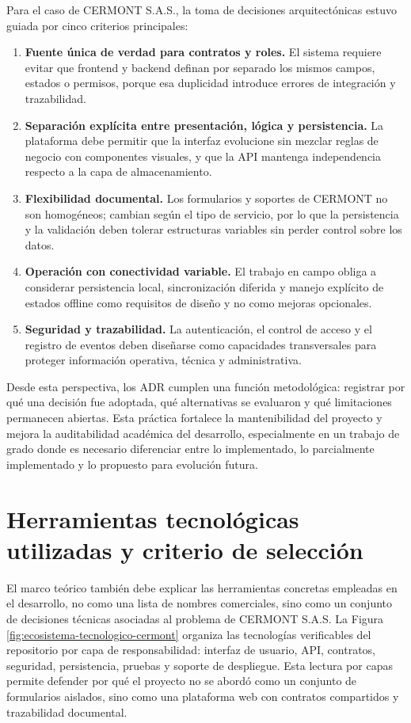 Para el caso de CERMONT S.A.S., la toma de decisiones arquitectónicas estuvo guiada por cinco criterios principales:

\begin{enumerate}
    \item \textbf{Fuente única de verdad para contratos y roles.} El sistema requiere evitar que frontend y backend definan por separado los mismos campos, estados o permisos, porque esa duplicidad introduce errores de integración y trazabilidad.
    \item \textbf{Separación explícita entre presentación, lógica y persistencia.} La plataforma debe permitir que la interfaz evolucione sin mezclar reglas de negocio con componentes visuales, y que la API mantenga independencia respecto a la capa de almacenamiento.
    \item \textbf{Flexibilidad documental.} Los formularios y soportes de CERMONT no son homogéneos; cambian según el tipo de servicio, por lo que la persistencia y la validación deben tolerar estructuras variables sin perder control sobre los datos.
    \item \textbf{Operación con conectividad variable.} El trabajo en campo obliga a considerar persistencia local, sincronización diferida y manejo explícito de estados offline como requisitos de diseño y no como mejoras opcionales.
    \item \textbf{Seguridad y trazabilidad.} La autenticación, el control de acceso y el registro de eventos deben diseñarse como capacidades transversales para proteger información operativa, técnica y administrativa.
\end{enumerate}

Desde esta perspectiva, los ADR cumplen una función metodológica: registrar por qué una decisión fue adoptada, qué alternativas se evaluaron y qué limitaciones permanecen abiertas. Esta práctica fortalece la mantenibilidad del proyecto y mejora la auditabilidad académica del desarrollo, especialmente en un trabajo de grado donde es necesario diferenciar entre lo implementado, lo parcialmente implementado y lo propuesto para evolución futura.

\section{Herramientas tecnológicas utilizadas y criterio de selección}
\label{sec:herramientas-stack-teorico}

El marco teórico también debe explicar las herramientas concretas empleadas en el desarrollo, no como una lista de nombres comerciales, sino como un conjunto de decisiones técnicas asociadas al problema de CERMONT S.A.S. La Figura \ref{fig:ecosistema-tecnologico-cermont} organiza las tecnologías verificables del repositorio por capa de responsabilidad: interfaz de usuario, API, contratos, seguridad, persistencia, pruebas y soporte de despliegue. Esta lectura por capas permite defender por qué el proyecto no se abordó como un conjunto de formularios aislados, sino como una plataforma web con contratos compartidos y trazabilidad documental.

